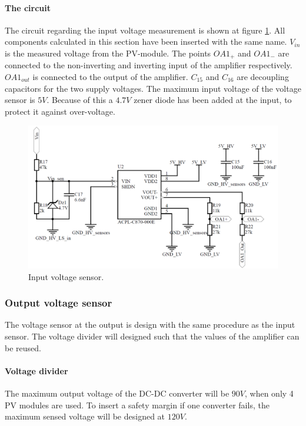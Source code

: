 \paragraph{The circuit}
The circuit regarding the input voltage measurement is shown at figure \ref{fig:input_voltage_sensor_circuit}. All components calculated in this section have been inserted with the same name. $V_{in}$ is the measured voltage from the PV-module. The points $OA1_+$ and $OA1_-$ are connected to the non-inverting and inverting input of the amplifier respectively. $OA1_{out}$ is connected to the output of the amplifier. $C_{15}$ and $C_{16}$ are decoupling capacitors for the two supply voltages. The maximum input voltage of the voltage sensor is $5V$. Because of this a $4.7V$ zener diode has been added at the input, to protect it against over-voltage.

\begin{figure}[H]
	\begin{center}
		\includegraphics[width=0.8\linewidth]{../Pictures/P1/Sensors/input_voltage_sensor.PNG}
		\caption{Input voltage sensor.}
		\label{fig:input_voltage_sensor_circuit}
	\end{center}
\end{figure}

\subsubsection{Output voltage sensor}
The voltage sensor at the output is design with the same procedure as the input sensor. The voltage divider will designed such that the values of the amplifier can be reused.

\paragraph{Voltage divider}
The maximum output voltage of the DC-DC converter will be $90V$, when only 4 PV modules are used. To insert a safety margin if one converter fails, the maximum sensed voltage will be designed at $120V$.

